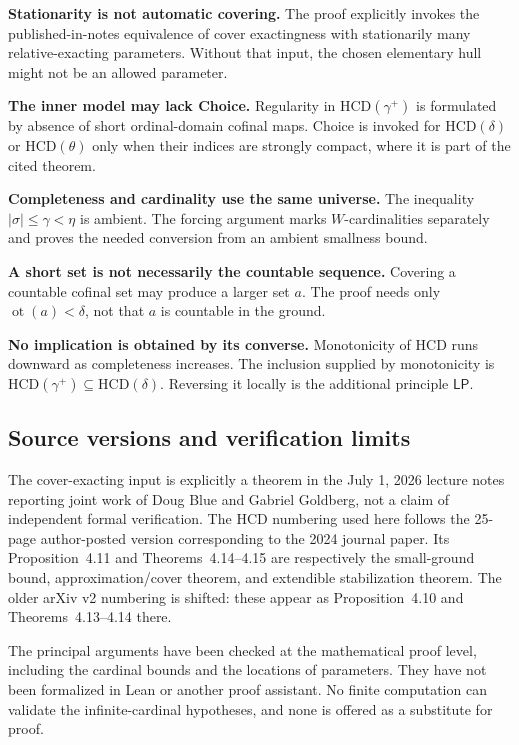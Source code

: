 \documentclass[11pt,letterpaper]{article}
\theoremstyle{definition}
\newcommand{\ot}{\operatorname{ot}}
\newcommand{\HCD}{\mathrm{HCD}}
\newcommand{\LP}{\mathsf{LP}}
\numberwithin{equation}{section}
\begin{document}
\textbf{Stationarity is not automatic covering.} The proof explicitly invokes the published-in-notes equivalence of cover exactingness with stationarily many relative-exacting parameters. Without that input, the chosen elementary hull might not be an allowed parameter.

\textbf{The inner model may lack Choice.} Regularity in $\HCD(\gamma^+)$ is formulated by absence of short ordinal-domain cofinal maps. Choice is invoked for $\HCD(\delta)$ or $\HCD(\theta)$ only when their indices are strongly compact, where it is part of the cited theorem.

\textbf{Completeness and cardinality use the same universe.} The inequality $|\sigma|\leq\gamma<\eta$ is ambient. The forcing argument marks $W$-cardinalities separately and proves the needed conversion from an ambient smallness bound.

\textbf{A short set is not necessarily the countable sequence.} Covering a countable cofinal set may produce a larger set $a$. The proof needs only $\ot(a)<\delta$, not that $a$ is countable in the ground.

\textbf{No implication is obtained by its converse.} Monotonicity of HCD runs downward as completeness increases. The inclusion supplied by monotonicity is $\HCD(\gamma^+)\subseteq\HCD(\delta)$. Reversing it locally is the additional principle $\LP$.

\subsection{Source versions and verification limits}

The cover-exacting input is explicitly a theorem in the July 1, 2026 lecture notes reporting joint work of Doug Blue and Gabriel Goldberg, not a claim of independent formal verification. The HCD numbering used here follows the 25-page author-posted version corresponding to the 2024 journal paper. Its Proposition~4.11 and Theorems~4.14--4.15 are respectively the small-ground bound, approximation/cover theorem, and extendible stabilization theorem. The older arXiv v2 numbering is shifted: these appear as Proposition~4.10 and Theorems~4.13--4.14 there.

The principal arguments have been checked at the mathematical proof level, including the cardinal bounds and the locations of parameters. They have not been formalized in Lean or another proof assistant. No finite computation can validate the infinite-cardinal hypotheses, and none is offered as a substitute for proof.
\end{document}
